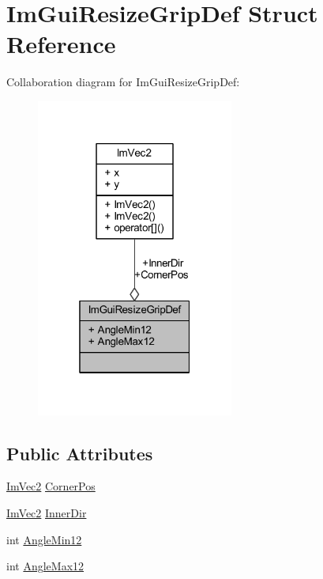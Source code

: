 \hypertarget{struct_im_gui_resize_grip_def}{}\section{Im\+Gui\+Resize\+Grip\+Def Struct Reference}
\label{struct_im_gui_resize_grip_def}


Collaboration diagram for Im\+Gui\+Resize\+Grip\+Def\+:
\nopagebreak
\begin{figure}[H]
\begin{center}
\leavevmode
\includegraphics[width=184pt]{struct_im_gui_resize_grip_def__coll__graph}
\end{center}
\end{figure}
\subsection*{Public Attributes}
\begin{DoxyCompactItemize}
\item 
\mbox{\hyperlink{struct_im_vec2}{Im\+Vec2}} \mbox{\hyperlink{struct_im_gui_resize_grip_def_ab8ffa45cb1ef3e825f5817b60c1555aa}{Corner\+Pos}}
\item 
\mbox{\hyperlink{struct_im_vec2}{Im\+Vec2}} \mbox{\hyperlink{struct_im_gui_resize_grip_def_a82a1367d835f206fc24b3f114c60f897}{Inner\+Dir}}
\item 
int \mbox{\hyperlink{struct_im_gui_resize_grip_def_a5b335b7be8f517e38c56a5fd8e01d54c}{Angle\+Min12}}
\item 
int \mbox{\hyperlink{struct_im_gui_resize_grip_def_a697cdecca28177e275ce7ec38ef8e802}{Angle\+Max12}}
\end{DoxyCompactItemize}


